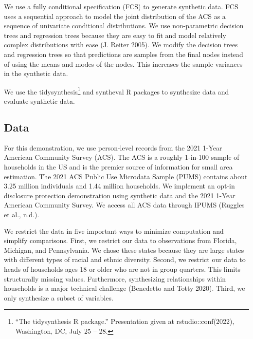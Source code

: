 \documentclass[
]{urban-formatting}
\begin{document}
We use a fully conditional specification (FCS) to generate synthetic
data. FCS uses a sequential approach to model the joint distribution of
the ACS as a sequence of univariate conditional distributions. We use
non-parametric decision trees and regression trees because they are easy
to fit and model relatively complex distributions with ease (J. Reiter
2005). We modify the decision trees and regression trees so that
predictions are samples from the final nodes instead of using the means
and modes of the nodes. This increases the sample variances in the
synthetic data.

We use the tidysynthesis\footnote{``The tidysynthesis R package.''
  Presentation given at rstudio::conf(2022), Washington, DC, July 25 --
  28.} and syntheval R packages to synthesize data and evaluate
synthetic data.

\subsection{Data}

For this demonstration, we use person-level records from the 2021 1-Year
American Community Survey (ACS). The ACS is a roughly 1-in-100 sample of
households in the US and is the premier source of information for small
area estimation. The 2021 ACS Public Use Microdata Sample (PUMS)
contains about 3.25 million individuals and 1.44 million households. We
implement an opt-in disclosure protection demonstration using synthetic
data and the 2021 1-Year American Community Survey. We access all ACS
data through IPUMS (Ruggles et al., n.d.).

We restrict the data in five important ways to minimize computation and
simplify comparisons. First, we restrict our data to observations from
Florida, Michigan, and Pennsylvania. We chose these states because they
are large states with different types of racial and ethnic diversity.
Second, we restrict our data to heads of households ages 18 or older who
are not in group quarters. This limits structurally missing values.
Furthermore, synthesizing relationships within households is a major
technical challenge (Benedetto and Totty 2020). Third, we only
synthesize a subset of variables.
\end{document}
